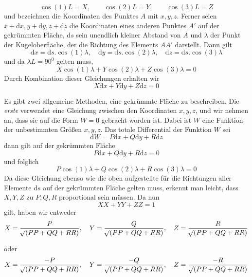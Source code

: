 %
\[
\cos(1)L=X,\qquad\cos(2)L=Y,\qquad\cos(3)L=Z
\]
\noindent und bezeichnen die Koordinaten des Punktes \(A\) mit \(x,y,z\). Ferner seien \(x+\mathrm{d}x,y+\mathrm{d}y,z+\mathrm{d}z\) die Koordinaten eines anderen Punktes \(A'\) auf der gekrümmten Fläche, \(\mathrm{d}s\) sein unendlich kleiner Abstand von \(A\) und \(\lambda\) der Punkt der Kugeloberfläche, der die Richtung des Elements \(AA'\) darstellt. Dann gilt
\[
\mathrm{d}x=\mathrm{d}s\mathord{.}\cos(1)\lambda,\quad\mathrm{d}y=\mathrm{d}s\mathord{.}\cos(2)\lambda,\quad\mathrm{d}z=\mathrm{d}s\mathord{.}\cos(3)\lambda
\]
\noindent und da \(\lambda L=90^0\) gelten muss,
\[
X\cos(1)\lambda+Y\cos(2)\lambda+Z\cos(3)\lambda=0
\]
\noindent Durch Kombination dieser Gleichungen erhalten wir
\[
X\mathrm{d}x+Y\mathrm{d}y+Z\mathrm{d}z=0
\]
\par\indent Es gibt zwei allgemeine Methoden, eine gekrümmte Fläche zu beschreiben. Die \textit{erste} verwendet eine Gleichung zwischen den Koordinaten \(x,y,z\), und wir nehmen an, dass sie auf die Form \(W=0\) gebracht worden ist. Dabei ist \(W\) eine Funktion der unbestimmten Größen \(x,y,z\). Das totale Differential der Funktion \(W\) sei
\[
\mathrm{d}W=P\mathrm{d}x+Q\mathrm{d}y+R\mathrm{d}z
\]
\noindent dann gilt auf der gekrümmten Fläche
\[
P\mathrm{d}x+Q\mathrm{d}y+R\mathrm{d}z=0
\]
\noindent und folglich
\[
P\cos(1)\lambda+Q\cos(2)\lambda+R\cos(3)\lambda=0
\]
\noindent Da diese Gleichung ebenso wie die oben aufgestellte für die Richtungen aller Elemente \(\mathrm{d}s\) auf der gekrümmten Fläche gelten muss, erkennt man leicht, dass \(X,Y,Z\) zu \(P,Q,R\) proportional sein müssen. Da nun
\[
XX+YY+ZZ=1
\]
\noindent gilt, haben wir entweder
\begingroup\small
\[
X=\frac{P}{\mathord{{}^{}\!\surd}(PP+QQ+RR)},\quad Y=\frac{Q}{\mathord{{}^{}\!\surd}(PP+QQ+RR)},\quad Z=\frac{R}{\mathord{{}^{}\!\surd}(PP+QQ+RR)}
\]\endgroup

\noindent oder
\begingroup\small
\[
X=\frac{-P}{\mathord{{}^{}\!\surd}(PP+QQ+RR)},\quad Y=\frac{-Q}{\mathord{{}^{}\!\surd}(PP+QQ+RR)},\quad Z=\frac{-R}{\mathord{{}^{}\!\surd}(PP+QQ+RR)}
\]\endgroup

